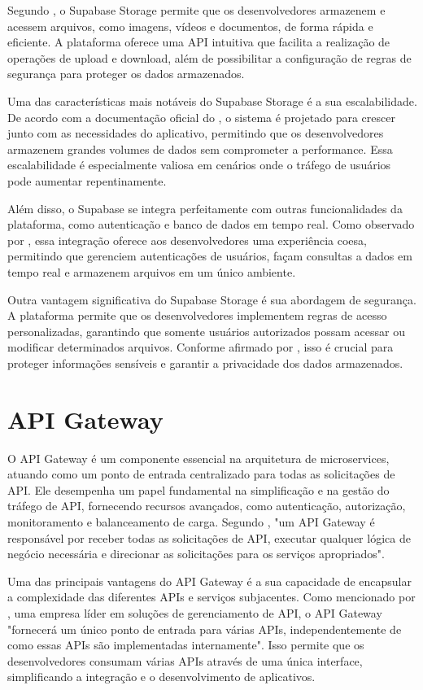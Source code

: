 Segundo \cite{Gregoire2021}, o Supabase Storage permite que os desenvolvedores armazenem
e acessem arquivos, como imagens, vídeos e documentos, de forma rápida e eficiente. A
plataforma oferece uma API intuitiva que facilita a realização de operações de upload e download,
além de possibilitar a configuração de regras de segurança para proteger os dados armazenados.

Uma das características mais notáveis do Supabase Storage é a sua escalabilidade. De
acordo com a documentação oficial do \cite{supabase2023documentation}, o sistema é projetado para crescer
junto com as necessidades do aplicativo, permitindo que os desenvolvedores armazenem grandes
volumes de dados sem comprometer a performance. Essa escalabilidade é especialmente valiosa
em cenários onde o tráfego de usuários pode aumentar repentinamente.

Além disso, o Supabase se integra perfeitamente com outras funcionalidades da plataforma, como autenticação e banco de dados em tempo real. Como observado por \cite{Miller2022}, essa integração oferece aos desenvolvedores uma experiência coesa, permitindo que gerenciem autenticações de usuários, façam consultas a dados em tempo real e armazenem arquivos em um único ambiente.

Outra vantagem significativa do Supabase Storage é sua abordagem de segurança. A
plataforma permite que os desenvolvedores implementem regras de acesso personalizadas,
garantindo que somente usuários autorizados possam acessar ou modificar determinados arquivos.
Conforme afirmado por \cite{ONeill2022}, isso é crucial para proteger informações sensíveis e
garantir a privacidade dos dados armazenados.

\section*{API Gateway}

O API Gateway é um componente essencial na arquitetura de microservices, atuando
como um ponto de entrada centralizado para todas as solicitações de API. Ele desempenha
um papel fundamental na simplificação e na gestão do tráfego de API, fornecendo recursos
avançados, como autenticação, autorização, monitoramento e balanceamento de carga. Segundo
\cite{w3c2023webapi}, "um API Gateway é responsável por receber todas as solicitações de API, executar
qualquer lógica de negócio necessária e direcionar as solicitações para os serviços apropriados".

Uma das principais vantagens do API Gateway é a sua capacidade de encapsular a
complexidade das diferentes APIs e serviços subjacentes. Como mencionado por \cite{Kong2023},
uma empresa líder em soluções de gerenciamento de API, o API Gateway "fornecerá um único
ponto de entrada para várias APIs, independentemente de como essas APIs são implementadas
internamente". Isso permite que os desenvolvedores consumam várias APIs através de uma única
interface, simplificando a integração e o desenvolvimento de aplicativos.

